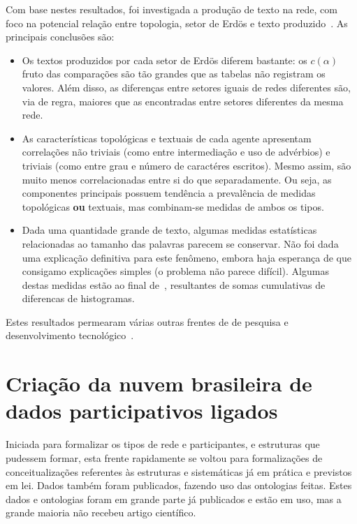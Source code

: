 \documentclass[a4paper,openright,12pt]{report} %
\begin{document}
Com base nestes resultados, foi investigada a produção de texto na rede,
com foco na potencial relação entre topologia, setor de Erdös e texto produzido~\cite{rcText}. As principais conclusões são:
\begin{itemize}
	\item Os textos produzidos por cada setor de Erdös diferem bastante: os $c(\alpha)$ fruto das comparações são tão grandes que as tabelas não registram os valores. Além disso, as diferenças entre setores iguais de redes diferentes são, via de regra, maiores que as encontradas entre setores diferentes da mesma rede.
	\item As características topológicas e textuais de cada agente apresentam correlações não triviais (como entre intermediação e uso de advérbios) e triviais (como entre grau e número de caractéres escritos).
		Mesmo assim, são muito menos correlacionadas entre si do que separadamente. Ou seja, as componentes principais possuem tendência
		a prevalência de medidas topológicas {\bf ou} textuais,
		mas combinam-se medidas de ambos os tipos.
	\item Dada uma quantidade grande de texto, algumas medidas estatísticas 
		relacionadas ao tamanho das palavras parecem se conservar. Não foi dada uma explicação definitiva para este fenômeno, embora haja esperança de que consigamo explicações simples (o problema não parece difícil). Algumas destas medidas estão ao final de~\cite{rcText}, resultantes de somas cumulativas de diferencas de histogramas.
\end{itemize}

Estes resultados permearam várias outras frentes de
de pesquisa e desenvolvimento tecnológico~\cite{prod1,prod2,prod3,prod4,prod5,ops,versinus}.

\section{Criação da nuvem brasileira de dados participativos ligados}
Iniciada para formalizar os tipos de rede e participantes, e estruturas
que pudessem formar, esta frente rapidamente se voltou para
formalizações de conceitualizações referentes às estruturas
e sistemáticas já em prática e previstos em lei.
Dados também foram publicados, fazendo uso das ontologias
feitas. Estes dados e ontologias foram em grande parte
já publicados e estão em uso, mas a grande maioria não
recebeu artigo científico.

\end{document}
